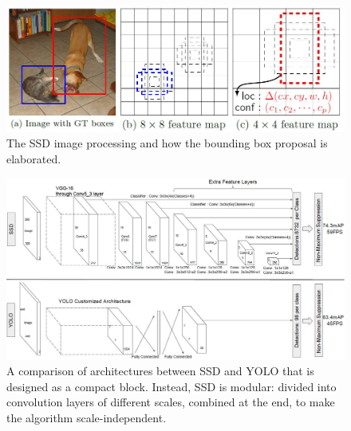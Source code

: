 \begin{figure}[!h]
\centering
\includegraphics[width=0.8\linewidth]{images/detection/howItWorks_ssd}
\caption{The SSD image processing and how the bounding box proposal is elaborated.}
\label{fig:howItWorks_ssd}
\end{figure}
\begin{figure}[!h]
\centering
\includegraphics[width=1\linewidth]{images/detection/architecture_ssdVSyolo}
\caption{A comparison of architectures between SSD and YOLO that is designed as a compact block. Instead, SSD is modular: divided into convolution layers of different scales, combined at the end, to make the algorithm scale-independent.}
\label{fig:architecture_ssdVSyolo}
\end{figure}


